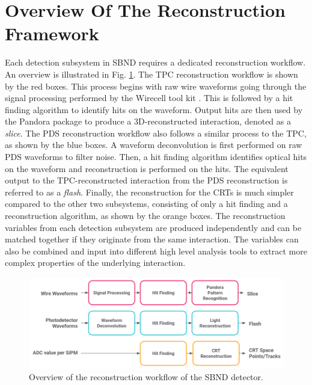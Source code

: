 
\section{Overview Of The Reconstruction Framework}
\label{sec:reco_overview}

Each detection subsystem in SBND requires a dedicated reconstruction workflow.
An overview is illustrated in Fig. \ref{fig:Reco_Workflow}.
The TPC reconstruction workflow is shown by the red boxes.
This process begins with raw wire waveforms going through the signal processing performed by the Wirecell tool kit \cite{wirecell}.
This is followed by a hit finding algorithm to identify hits on the waveform.
Output hits are then used by the Pandora package \cite{pandora} to produce a 3D-reconstructed interaction, denoted as a \textit{slice}.
The PDS reconstruction workflow also follows a similar process to the TPC, as shown by the blue boxes.
A waveform deconvolution is first performed on raw PDS waveforms to filter noise.
Then, a hit finding algorithm identifies optical hits on the waveform and reconstruction is performed on the hits.
The equivalent output to the TPC-reconstructed interaction from the PDS reconstruction is referred to as a \textit{flash}.
Finally, the reconstruction for the CRTs is much simpler compared to the other two subsystems, consisting of only a hit finding and a reconstruction algorithm, as shown by the orange boxes.
The reconstruction variables from each detection subsystem are produced independently and can be matched together if they originate from the same interaction. 
The variables can also be combined and input into different high level analysis tools to extract more complex properties of the underlying interaction. 

\begin{figure}[htbp!] 
\centering    
\includegraphics[width=1.0\textwidth]{Reco_Workflow}
\caption[Reconstruction Framework of SBND]{
Overview of the reconstruction workflow of the SBND detector.
}
\label{fig:Reco_Workflow}
\end{figure}

